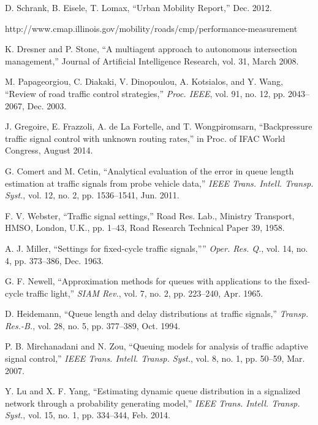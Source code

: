 \documentclass[conference]{IEEEtran}
\begin{document}
\vspace{-5pt}

\begin{thebibliography}{}


 D. Schrank, B. Eisele, T. Lomax, ``Urban Mobility Report,'' Dec. 2012.

 http://www.cmap.illinois.gov/mobility/roads/cmp/performance-measurement

 K. Dresner and P. Stone, ``A multiagent approach to autonomous intersection management,'' Journal of Artificial Intelligence Research, vol. 31, March 2008.

 M. Papageorgiou, C. Diakaki, V. Dinopoulou, A. Kotsialos, and Y. Wang, ``Review of road traffic control strategies,'' {\em Proc. IEEE}, vol. 91, no. 12, pp. 2043--2067, Dec. 2003.


 J. Gregoire, E. Frazzoli, A. de La Fortelle, and T. Wongpiromsarn,  ``Backpressure traffic signal control with unknown routing rates,'' in Proc. of IFAC World Congress, August 2014.


 G. Comert and M. Cetin, ``Analytical evaluation of the error in queue length estimation at traffic signals from probe vehicle data,'' {\em IEEE Trans. Intell. Transp. Syst.}, vol. 12, no. 2, pp. 1536--1541, Jun. 2011.

 F. V. Webster, ``Traffic signal settings,'' Road Res. Lab., Ministry Transport, HMSO, London, U.K., pp. 1--43, Road Research Technical Paper 39, 1958.

 A. J. Miller, ``Settings for fixed-cycle traffic signals,”'' {\em Oper. Res. Q.}, vol. 14, no. 4, pp. 373--386, Dec. 1963.

 G. F. Newell, ``Approximation methods for queues with applications to the fixed-cycle traffic light,'' {\em SIAM Rev.}, vol. 7, no. 2, pp. 223--240, Apr. 1965.

 D. Heidemann, ``Queue length and delay distributions at traffic signals,'' {\em Transp. Res.-B.}, vol. 28, no. 5, pp. 377--389, Oct. 1994.

 P. B. Mirchanadani and N. Zou, ``Queuing models for analysis of traffic adaptive signal control,'' {\em IEEE Trans. Intell. Transp. Syst.}, vol. 8, no. 1, pp. 50--59, Mar. 2007.

 Y. Lu and X. F. Yang, ``Estimating dynamic queue distribution in a signalized network through a probability generating model,'' {\em IEEE Trans. Intell. Transp. Syst.}, vol. 15, no. 1, pp. 334--344, Feb. 2014.


\end{thebibliography}
\end{document}
